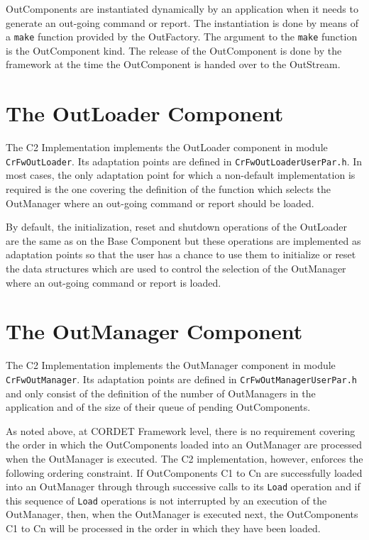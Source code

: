 \documentclass[a4paper,10pt]{article}
\let\stdsection\section
\renewcommand\section{\newpage\stdsection}
\begin{document}
OutComponents are instantiated dynamically by an application when it needs to generate an out-going command or report. The instantiation is done by means of a \texttt{make} function provided by the OutFactory. The argument to the \texttt{make} function is the OutComponent kind. The release of the OutComponent is done by the framework at the time the OutComponent is handed over to the OutStream.

\section{The OutLoader Component}\label{sec:OutLoader}


The C2 Implementation implements the OutLoader component in module \texttt{CrFwOutLoader}. Its adaptation points are defined in \texttt{CrFwOutLoaderUserPar.h}. In most cases, the only adaptation point for which a non-default implementation is required is the one covering the definition of the function which selects the OutManager where an out-going command or report should be loaded. 

By default, the initialization, reset and shutdown operations of the OutLoader are the same as on the Base Component but these operations are implemented as adaptation points so that the user has a chance to use them to initialize or reset the data structures which are used to control the selection of the OutManager where an out-going command or report is loaded.

\section{The OutManager Component}\label{sec:OutManager}


The C2 Implementation implements the OutManager component in module \texttt{CrFwOutManager}. Its adaptation points are defined in \texttt{CrFwOutManagerUserPar.h} and only consist of the definition of the number of OutManagers in the application and of the size of their queue of pending OutComponents. 

As noted above, at CORDET Framework level, there is no requirement covering the order in which the OutComponents loaded into an OutManager are processed when the OutManager is executed. The C2 implementation, however, enforces the following ordering constraint. If OutComponents C1 to Cn are successfully loaded into an OutManager through through successive calls to its \texttt{Load} operation and if this sequence of \texttt{Load} operations is not interrupted by an execution of the OutManager, then, when the OutManager is executed next, the OutComponents C1 to Cn will be processed in the order in which they have been loaded.
\end{document}
